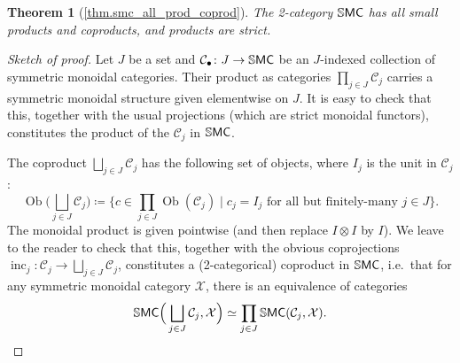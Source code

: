\documentclass[11pt, oneside, article]{memoir}
\theoremstyle{plain}
\newtheorem*{theorem*}{Theorem}
\theoremstyle{definition}
\theoremstyle{remark}
\newcommand{\Set}[1]{\mathrm{#1}}%
\newcommand{\cat}[1]{\mathcal{#1}}%
\newcommand{\Cat}[1]{{\mathsf{#1}}}%
\newcommand{\CCat}[1]{\mathbb{\StrLeft{#1}{1}}\Cat{\StrGobbleLeft{#1}{1}}}%
\DeclareMathOperator{\ob}{\Set{Ob}}
\DeclareMathOperator{\inc}{inc}
\newcommand{\ssmc}{\CCat{SMC}}
\begin{document}
\begin{theorem*}[\ref{thm.smc_all_prod_coprod}]\label{page.smc_all_prod_coprod}
The 2-category $\ssmc$ has all small products and coproducts, and products are strict.
\end{theorem*}
\begin{proof}[Sketch of proof]
Let $J$ be a set and $\cat{C}_\bullet\colon J\to\ssmc$ be an $J$-indexed collection of symmetric monoidal categories. Their product as categories $\prod_{j\in J}\cat{C}_j$ carries a symmetric monoidal structure given elementwise on $J$. It is easy to check that this, together with the usual projections (which are strict monoidal functors), constitutes the product of the $\cat{C}_j$ in $\ssmc$.

The coproduct $\bigsqcup_{j\in J}\cat{C}_j$ has the following set of objects, where $I_j$ is the unit in $\cat{C}_j$:
\[
\ob\bigg(\bigsqcup_{j\in J}\cat{C}_j\bigg)\coloneqq
\bigg\{
c\in\prod_{j\in J}\ob(\cat{C}_j)
\;\bigg|\;
c_j=I_j\text{ for all but finitely-many }j\in J
\bigg\}.
\]
The monoidal product is given pointwise (and then replace $I\otimes I$ by $I$). We leave to the reader to check that this, together with the obvious coprojections $\inc_j\colon\cat{C}_j\to\bigsqcup_{j\in J}\cat{C}_j$, constitutes a (2-categorical) coproduct in $\ssmc$, i.e.\ that for any symmetric monoidal category $\cat{X}$, there is an equivalence of categories
\[
  \ssmc\Big(\bigsqcup_{j\in J}\cat{C}_j,\cat{X}\Big)\simeq\prod_{j\in J}\ssmc(\cat{C}_j,\cat{X}).
\qedhere
\]
\end{proof}
\end{document}
